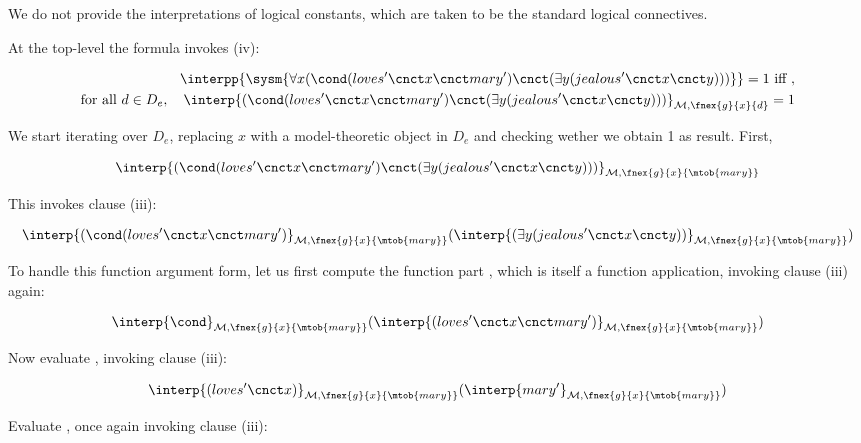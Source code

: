 \documentclass[11pt,a4paper,draft]{article}
\begin{document}
We do not provide the interpretations of logical constants, which are taken to be the standard logical connectives.

At the top-level the formula invokes (iv): 

\begin{align}
\interpp{\sysm{\forall x (\cond (loves'\cnct x\cnct mary')\cnct (\exists y (jealous'\cnct x\cnct y)))}} = 1 \text{ iff }, \\
\text{for all } d \in D_e,\quad \interp{(\cond (loves'\cnct x\cnct mary')\cnct (\exists y (jealous'\cnct x\cnct y)))}_{\mathcal{M},\fnex{g}{x}{d}} = 1
\end{align}

We start iterating over $D_e$, replacing $x$ with a model-theoretic object in $D_e$ and checking wether we obtain 1 as result. First,

\begin{align}
\interp{(\cond (loves'\cnct x\cnct mary')\cnct (\exists y (jealous'\cnct x\cnct y)))}_{\mathcal{M},\fnex{g}{x}{\mtob{mary}}}
\end{align}

This invokes clause (iii):

\begin{align}
\interp{(\cond (loves'\cnct x\cnct mary')}_{\mathcal{M},\fnex{g}{x}{\mtob{mary}}} (\interp{(\exists y (jealous'\cnct x\cnct y))}_{\mathcal{M},\fnex{g}{x}{\mtob{mary}}})
\end{align}

To handle this function argument form, let us first compute the function part  , which is itself a function application, invoking clause (iii) again:

\begin{align}
\interp{\cond}_{\mathcal{M},\fnex{g}{x}{\mtob{mary}}} (\interp{(loves'\cnct x\cnct mary')}_{\mathcal{M},\fnex{g}{x}{\mtob{mary}}})
\end{align}

Now evaluate , invoking clause (iii):

\begin{align}\label{lovesxmary}
\interp{(loves'\cnct x)}_{\mathcal{M},\fnex{g}{x}{\mtob{mary}}} (\interp{mary'}_{\mathcal{M},\fnex{g}{x}{\mtob{mary}}})
\end{align}

Evaluate , once again invoking clause (iii):
\end{document}
